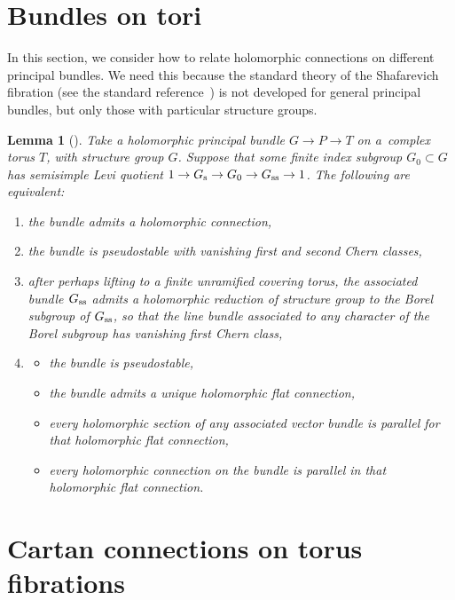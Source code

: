 \documentclass[10pt,a4paper]{amsart}
\numberwithin{equation}{section}
\newtheorem{Lemma}[Theorem]{Lemma}
\begin{document}
\section{Bundles on tori}\label{section:bundles.on.tori}
In this section, we consider how to relate holomorphic connections on different principal bundles.
We need this because the standard theory of the Shafarevich fibration (see the standard reference~\cite{Zuo:1999}) is not developed for general principal bundles, but only those with particular structure groups.
\begin{Lemma}[{\cite[Theorem 4.1]{Biswas/Gomez:2008}}]\label{lemma:BG}
Take a holomorphic principal bundle $G \to P \to T$ on a~complex torus $T$, with structure group $G$.
Suppose that some finite index subgroup $G_0 \subset G$ has semisimple Levi quotient $1 \to G_{\rm s}
 \to G_0 \to G_{\rm ss} \to 1$.
The following are equivalent:
\begin{enumerate}\itemsep=0pt
\item[$(1)$]
the bundle admits a holomorphic connection,
\item[$(2)$]
the bundle is pseudostable with vanishing first and second Chern classes,
\item[$(3)$]
after perhaps lifting to a finite unramified covering torus, the associated bundle $G_{\rm ss}$ admits a holomorphic reduction of structure group to the Borel subgroup of $G_{\rm ss}$, so that the line bundle associated to any character of the Borel subgroup has vanishing first Chern class,
\item[$(4)$]
\begin{itemize}\itemsep=0pt
\item
the bundle is pseudostable,
\item
the bundle admits a unique holomorphic flat connection,
\item
every holomorphic section of any associated vector bundle is parallel for that holomorphic flat connection,
\item
every holomorphic connection on the bundle is parallel in that holomorphic flat connection.
\end{itemize}
\end{enumerate}
\end{Lemma}

\section{Cartan connections on torus fibrations}\label{section:Cartan.torus.fib}
\end{document}
